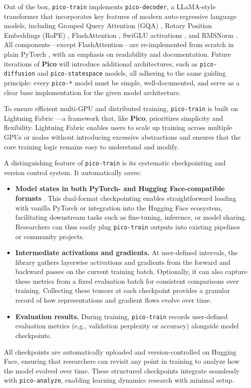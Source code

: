 Out of the box, \texttt{pico-train} implements \texttt{pico-decoder}, a LLaMA-style transformer \citep{touvron2023llama} that incorporates key features of modern auto-regressive language models, including Grouped Query Attention (GQA) \citep{ainslie2023gqa}, Rotary Position Embeddings (RoPE) \citep{su2024rope}, FlashAttention \citep{dao2022flashattention}, SwiGLU activations \citep{shazeer2020glu}, and RMSNorm \citep{zhang2019rmsnorm}. All components—except FlashAttention—are re-implemented from scratch in plain PyTorch \citep{paszke2017pytorch}, with an emphasis on readability and documentation. Future iterations of \textbf{Pico} will introduce additional architectures, such as \texttt{pico-diffusion} and \texttt{pico-statespace} models, all adhering to the same guiding principle: every \texttt{pico-*} model must be simple, well-documented, and serve as a clear base implementation for the given model architecture.

To ensure efficient multi-GPU and distributed training, \texttt{pico-train} is built on Lightning Fabric \citep{lightning-fabric}—a framework that, like \textbf{Pico}, prioritizes simplicity and flexibility. Lightning Fabric enables users to scale up training across multiple GPUs or nodes without introducing excessive abstractions and ensures that the core training logic remains easy to understand and modify.

A distinguishing feature of \texttt{pico-train} is its systematic checkpointing and version control system. It automatically saves:
\begin{itemize}
    \item \textbf{Model states in both PyTorch- and Hugging Face-compatible formats} \citep{huggingface}. This dual-format checkpointing enables straightforward loading with vanilla PyTorch or integration into the Hugging Face ecosystem, facilitating downstream tasks such as fine-tuning, inference, or model sharing. Researchers can thus easily plug \texttt{pico-train} outputs into existing pipelines or community projects.

    \item \textbf{Intermediate activations and gradients.} At user-defined intervals, the library gathers layerwise activations and gradients from the forward and backward passes on the current training batch. Optionally, it can also capture these metrics from a fixed evaluation batch for consistent comparisons over training. Collecting these tensors at each checkpoint provides a granular record of how representations and gradient flows evolve over time.

    \item \textbf{Evaluation results.} During training, \texttt{pico-train} records user-defined evaluation metrics (e.g., validation perplexity or accuracy) alongside model checkpoints.
\end{itemize}
\vspace{-0.2em}
All checkpoints are automatically uploaded and version-controlled on Hugging Face, ensuring that researchers can revisit any point in training to analyze how the model evolved over time. These structured checkpoints integrate seamlessly with \texttt{pico-analyze}, enabling learning dynamics research with minimal setup.

